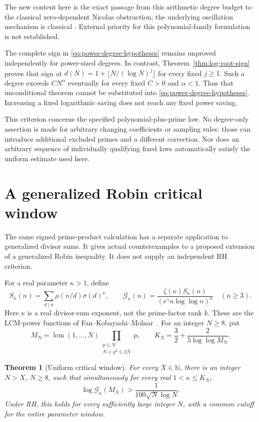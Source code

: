 \documentclass[11pt]{article}
\newtheorem{theorem}{Theorem}[section]
\theoremstyle{definition}
\newcommand{\N}{\mathbb N}
\begin{document}
The new content here is the exact passage from this arithmetic
degree budget to the classical zero-dependent Nicolas obstruction;
the underlying oscillation mechanism is classical
\cite{Nicolas1983,Nicolas2012}. External priority for this
polynomial-family formulation is not established.

The complete sign in \eqref{eq:power-degree-hypotheses} remains
unproved independently for power-sized degrees. In contrast,
Theorem~\ref{thm:log-root-sign} proves that sign at
$d(N)=1+\lfloor N/(\log N)^j\rfloor$ for every fixed $j\ge1$.
Such a degree exceeds $CN^\alpha$ eventually for every fixed
$C>0$ and $\alpha<1$. Thus that unconditional theorem cannot be
substituted into \eqref{eq:power-degree-hypotheses}. Increasing
a fixed logarithmic saving does not reach any fixed power saving.

This criterion concerns the specified polynomial-plus-prime law.
No degree-only assertion is made for arbitrary changing
coefficients or sampling rules: those can introduce additional
excluded primes and a different correction. Nor does an arbitrary
sequence of individually qualifying fixed laws automatically
satisfy the uniform estimate used here.

\section{A generalized Robin critical window}
\label{sec:lcm-window}

The same signed prime-product calculation has a separate application
to generalized divisor sums. It gives actual counterexamples to a
proposed extension of a generalized Robin inequality. It does not
supply an independent RH criterion.

For a real parameter $\kappa>1$, define
\[
 S_\kappa(n)=\sum_{d\mid n}\mu(n/d)\sigma(d)^\kappa,\qquad
 \mathcal G_\kappa(n)=
 \frac{\zeta(\kappa)S_\kappa(n)}
 {(e^\gamma n\log\log n)^\kappa}\quad(n\ge3).
\]
Here $\kappa$ is a real divisor-sum exponent, not the prime-factor
rank $k$. These are the LCM-power functions of
Fan--Kobayashi--Molnar~\cite[Definition~1.2]{FKM}.
For an integer $N\ge8$, put
\begin{equation}\label{eq:modified-lcm}
 M_N=\operatorname{lcm}(1,\ldots,N)
       \prod_{\substack{p\le N\\N<p^2\le2N}}p,\qquad
 K_N=\frac32+\frac{2}{5\log\log M_N}.
\end{equation}

\begin{theorem}[Uniform critical window]\label{thm:lcm-window}
For every $X\in\N$, there is an integer $N>X$, $N\ge8$, such that
simultaneously for every real $1<\kappa\le K_N$,
\begin{equation}\label{eq:lcm-window-margin}
 \log\mathcal G_\kappa(M_N)>
       \frac1{100\sqrt N\log N}.
\end{equation}
Under RH, this holds for every sufficiently large integer $N$,
with a common cutoff for the entire parameter window.
\end{theorem}
\end{document}
